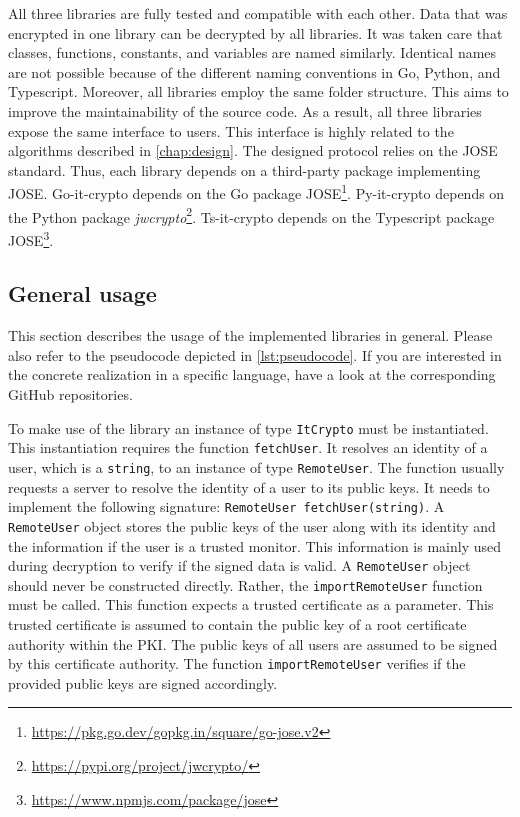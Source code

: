 \documentclass[../main.tex]{subfiles}
\begin{document}
All three libraries are fully tested and compatible with each other.
Data that was encrypted in one library can be decrypted by all libraries.
It was taken care that classes, functions, constants, and variables are named similarly.
Identical names are not possible because of the different naming conventions in Go, Python, and Typescript.
Moreover, all libraries employ the same folder structure.
This aims to improve the maintainability of the source code.
As a result, all three libraries expose the same interface to users.
This interface is highly related to the algorithms described in \cref{chap:design}.
The designed protocol relies on the JOSE standard.
Thus, each library depends on a third-party package implementing JOSE.
Go-it-crypto depends on the Go package JOSE\footnote{\url{https://pkg.go.dev/gopkg.in/square/go-jose.v2}}.
Py-it-crypto depends on the Python package \emph{jwcrypto}\footnote{\url{https://pypi.org/project/jwcrypto/}}.
Ts-it-crypto depends on the Typescript package JOSE\footnote{\url{https://www.npmjs.com/package/jose}}.


\subsection{General usage}

This section describes the usage of the implemented libraries in general.
Please also refer to the pseudocode depicted in \cref{lst:pseudocode}.
If you are interested in the concrete realization in a specific language, have a look at the corresponding GitHub repositories.

To make use of the library an instance of type \verb|ItCrypto| must be instantiated.
This instantiation requires the function \verb|fetchUser|.
It resolves an identity of a user, which is a \verb|string|, to an instance of type \verb|RemoteUser|.
The function usually requests a server to resolve the identity of a user to its public keys.
It needs to implement the following signature: \verb|RemoteUser fetchUser(string)|.
A \verb|RemoteUser| object stores the public keys of the user along with its identity and the information if the user is a trusted monitor.
This information is mainly used during decryption to verify if the signed data is valid.
A \verb|RemoteUser| object should never be constructed directly.
Rather, the \verb|importRemoteUser| function must be called.
This function expects a trusted certificate as a parameter.
This trusted certificate is assumed to contain the public key of a root certificate authority within the PKI.
The public keys of all users are assumed to be signed by this certificate authority.
The function \verb|importRemoteUser| verifies if the provided public keys are signed accordingly.
\end{document}
